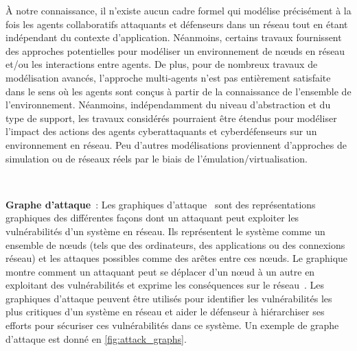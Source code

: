 À notre connaissance, il n'existe aucun cadre formel qui modélise précisément à la fois les agents collaboratifs attaquants et défenseurs dans un réseau tout en étant indépendant du contexte d'application.
Néanmoins, certains travaux fournissent des approches potentielles pour modéliser un environnement de nœuds en réseau et/ou les interactions entre agents.
De plus, pour de nombreux travaux de modélisation avancés, l'approche multi-agents n'est pas entièrement satisfaite dans le sens où les agents sont conçus à partir de la connaissance de l'ensemble de l'environnement.
Néanmoins, indépendamment du niveau d'abstraction et du type de support, les travaux considérés pourraient être étendus pour modéliser l'impact des actions des agents cyberattaquants et cyberdéfenseurs sur un environnement en réseau.
Peu d'autres modélisations proviennent d'approches de simulation ou de réseaux réels par le biais de l'émulation/virtualisation.

\

\noindent
\textbf{Graphe d'attaque}~: \quad Les graphiques d'attaque~\cite{CPhilips1998} sont des représentations graphiques des différentes façons dont un attaquant peut exploiter les vulnérabilités d'un système en réseau. Ils représentent le système comme un ensemble de nœuds (tels que des ordinateurs, des applications ou des connexions réseau) et les attaques possibles comme des arêtes entre ces nœuds. Le graphique montre comment un attaquant peut se déplacer d'un nœud à un autre en exploitant des vulnérabilités et exprime les conséquences sur le réseau~\cite{CPhilips1998}.
Les graphiques d'attaque peuvent être utilisés pour identifier les vulnérabilités les plus critiques d'un système en réseau et aider le défenseur à hiérarchiser ses efforts pour sécuriser ces vulnérabilités dans ce système. Un exemple de graphe d'attaque est donné en \autoref{fig:attack_graphs}.

